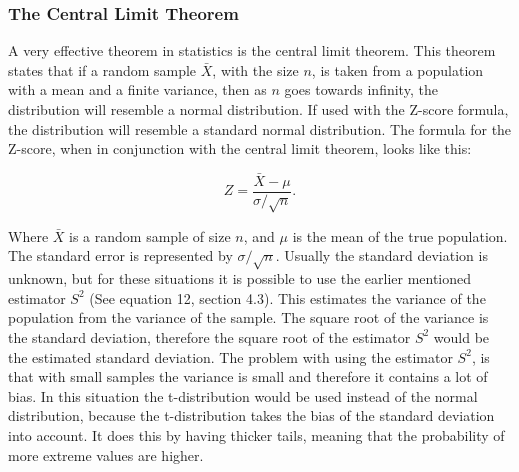 \subsubsection{The Central Limit Theorem}
A very effective theorem in statistics is the central limit theorem. This theorem states that if a random sample $\bar{X}$, with the size $n$, is taken from a population with a mean and a finite variance, then as $n$ goes towards infinity, the distribution will resemble a normal distribution. If used with the Z-score formula, the distribution will resemble a standard normal distribution. The formula for the Z-score, when in conjunction with the central limit theorem, looks like this:

\begin{equation}
Z=\frac{\bar{X}-\mu}{\sigma/\sqrt{n}}.
\end{equation}


\noindent Where $\bar{X}$ is a random sample of size $n$, and $\mu$ is the mean of the true population. The standard error is represented by $\sigma/\sqrt{n}$.
Usually the standard deviation is unknown, but for these situations it is possible to use the earlier mentioned estimator $S^2$ (See equation 12, section 4.3). This estimates the variance of the population from the variance of the sample.
The square root of the variance is the standard deviation, therefore the square root of the estimator $S^2$ would be the estimated standard deviation. The problem with using the estimator $S^2$, is that with small samples the variance is small and therefore it contains a lot of bias. In this situation the t-distribution would be used instead of the normal distribution, because the t-distribution takes the bias of the standard deviation into account. It does this by having thicker tails, meaning that the probability of more extreme values are higher.

